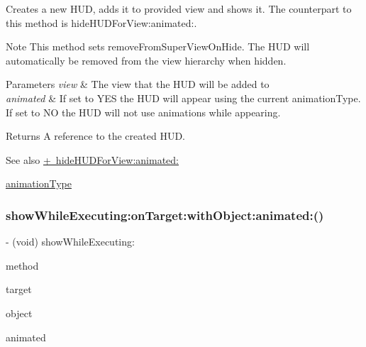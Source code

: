 Creates a new H\+UD, adds it to provided view and shows it. The counterpart to this method is hide\+H\+U\+D\+For\+View\+:animated\+:.

\begin{DoxyNote}{Note}
This method sets {\ttfamily remove\+From\+Super\+View\+On\+Hide}. The H\+UD will automatically be removed from the view hierarchy when hidden.
\end{DoxyNote}

\begin{DoxyParams}{Parameters}
{\em view} & The view that the H\+UD will be added to \\
\hline
{\em animated} & If set to Y\+ES the H\+UD will appear using the current animation\+Type. If set to NO the H\+UD will not use animations while appearing. \\
\hline
\end{DoxyParams}
\begin{DoxyReturn}{Returns}
A reference to the created H\+UD.
\end{DoxyReturn}
\begin{DoxySeeAlso}{See also}
\mbox{\hyperlink{interface_m_b_progress_h_u_d_a7b0826c34eea1a15d62aabd00c249666}{+ hide\+H\+U\+D\+For\+View\+:animated\+:}} 

\mbox{\hyperlink{interface_m_b_progress_h_u_d_a71d04bb9e2839df9377ad10d03b2e468}{animation\+Type}} 
\end{DoxySeeAlso}
\mbox{\label{interface_m_b_progress_h_u_d_abe8cfd9eee14280d49925dbc8188dc48}} 
\subsubsection{\texorpdfstring{show\+While\+Executing\+:on\+Target\+:with\+Object\+:animated\+:()}{showWhileExecuting:onTarget:withObject:animated:()}\hspace{0.1cm}{\footnotesize\ttfamily [1/3]}}
{\footnotesize\ttfamily -\/ (void) show\+While\+Executing\+: \begin{DoxyParamCaption}\item[{(S\+EL)}]{method }\item[{onTarget:(id)}]{target }\item[{withObject:(id)}]{object }\item[{animated:(B\+O\+OL)}]{animated }\end{DoxyParamCaption}}

